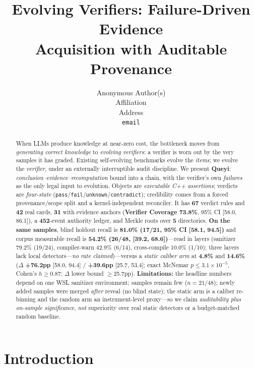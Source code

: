 \documentclass{article}
\title{Evolving Verifiers: Failure-Driven Evidence\\ Acquisition with Auditable Provenance}
\author{%
  Anonymous Author(s) \\
  Affiliation \\
  Address \\
  \texttt{email} \\
}
\begin{document}
\maketitle

\begin{abstract}
When LLMs produce knowledge at near-zero cost, the bottleneck moves from \emph{generating correct
knowledge} to \emph{evolving verifiers}: a verifier is worn out by the very samples it has
graded. Existing self-evolving benchmarks evolve the \emph{items}; we evolve the \emph{verifier},
under an externally interruptible audit discipline. We present \textbf{Queyi}:
\emph{conclusion--evidence--recomputation} bound into a chain, with the verifier's own
\emph{failures} as the only legal input to evolution. Objects are \emph{executable C++
assertions}; verdicts are \emph{four-state}
(\texttt{pass}/\texttt{fail}/\texttt{unknown}/\texttt{contradict}); credibility comes from a
forced provenance/scope split and a kernel-independent reconciler. It has \textbf{67} verdict
rules and \textbf{42} real cards, \textbf{31} with evidence anchors (\textbf{Verifier Coverage
73.8\%}, 95\% CI [58.0, 86.1]), a \textbf{452}-event authority ledger, and Merkle roots over
\textbf{5} directories. \textbf{On the same samples}, blind holdout recall is \textbf{81.0\%
(17/21, 95\% CI [58.1, 94.5])} and corpus measurable recall is \textbf{54.2\% (26/48, [39.2,
68.6])}---read in layers (sanitizer 79.2\% (19/24), compiler-warn 42.9\% (6/14), cross-compile
10.0\% (1/10); three layers lack local detectors---\emph{no rate claimed})---versus a
\emph{static caliber arm}
at \textbf{4.8\%} and \textbf{14.6\%} ($\Delta$ \textbf{+76.2pp} [58.0, 94.4] / \textbf{+39.6pp}
[25.7, 53.4]; exact McNemar $p\le3.1\times10^{-5}$, Cohen's $h\ge0.87$; $\Delta$ lower bound
$\ge$25.7pp). \textbf{Limitations:} the headline numbers depend on one WSL sanitizer environment;
samples remain few ($n{=}21/48$); newly added samples were merged \emph{after} reveal (no blind
state); the static arm is a caliber re-binning and the random arm an instrument-level
proxy---so we claim \emph{auditability plus on-sample significance}, \emph{not} superiority over
real static detectors or a budget-matched random baseline.
\end{abstract}

\section{Introduction}
\label{sec:intro}
\end{document}
